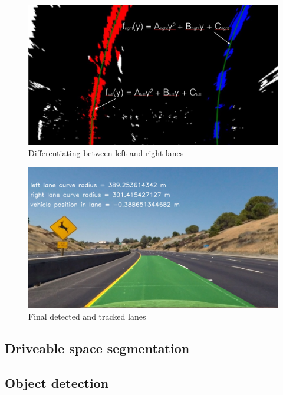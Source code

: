             \begin{figure}[htbp]
            \centerline{\includegraphics[width=\linewidth]{Figures/color_fit_lines.jpg}}
            \caption{Differentiating between left and right lanes}
            \end{figure}
    
            \begin{figure}[htbp]
            \centerline{\includegraphics[width=\linewidth]{Figures/test2.jpg}}
            \caption{Final detected and tracked lanes}
            \end{figure}
            
    	\subsection{Driveable space segmentation}
    	\subsection{Object detection}
    
